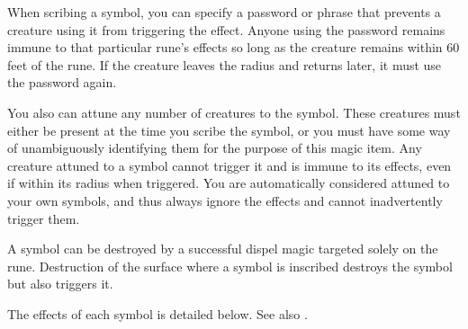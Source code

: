 When scribing a symbol, you can specify a password or phrase that prevents a creature using it from triggering the effect. 
Anyone using the password remains immune to that particular rune's effects so long as the creature remains within 60 feet of the rune. 
If the creature leaves the radius and returns later, it must use the password again.

You also can attune any number of creatures to the symbol. %
These creatures must either be present at the time you scribe the symbol, or you must have some way of unambiguously identifying them
for the purpose of this magic item.
Any creature attuned to a symbol cannot trigger it and is immune to its effects, even if within its radius when triggered. 
You are automatically considered attuned to your own symbols, and thus always ignore the effects and cannot inadvertently trigger them.


A symbol can be destroyed by a successful dispel magic targeted solely on the rune. 
Destruction of the surface where a symbol is inscribed destroys the symbol but also triggers it. 

The effects of each symbol is detailed below. See also .

